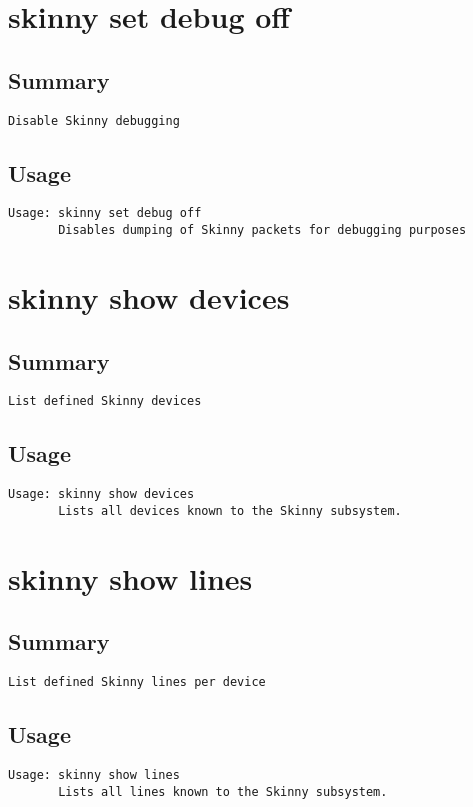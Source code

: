 \section{skinny set debug off}
\subsection{Summary}
\begin{verbatim}
Disable Skinny debugging
\end{verbatim}
\subsection{Usage}
\begin{verbatim}
Usage: skinny set debug off
       Disables dumping of Skinny packets for debugging purposes

\end{verbatim}


\section{skinny show devices}
\subsection{Summary}
\begin{verbatim}
List defined Skinny devices
\end{verbatim}
\subsection{Usage}
\begin{verbatim}
Usage: skinny show devices
       Lists all devices known to the Skinny subsystem.

\end{verbatim}


\section{skinny show lines}
\subsection{Summary}
\begin{verbatim}
List defined Skinny lines per device
\end{verbatim}
\subsection{Usage}
\begin{verbatim}
Usage: skinny show lines
       Lists all lines known to the Skinny subsystem.

\end{verbatim}


